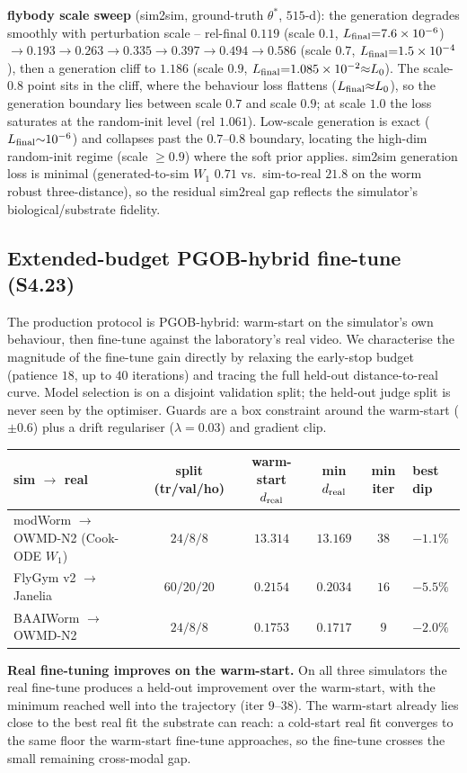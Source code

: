 \documentclass[11pt]{article}
\begin{document}
\textbf{flybody scale sweep} (sim2sim, ground-truth $\theta^{*}$, $515$-d): the generation degrades smoothly with perturbation scale -- rel-final $0.119$ (scale $0.1$, $L_{\rm final}{=}7.6\times10^{-6}$) $\to0.193\to0.263\to0.335\to0.397\to0.494\to0.586$ (scale $0.7$, $L_{\rm final}{=}1.5\times10^{-4}$), then a generation cliff to $1.186$ (scale $0.9$, $L_{\rm final}{=}1.085\times10^{-2}{\approx}L_0$). The scale-$0.8$ point sits in the cliff, where the behaviour loss flattens ($L_{\rm final}{\approx}L_0$), so the generation boundary lies between scale $0.7$ and scale $0.9$; at scale $1.0$ the loss saturates at the random-init level (rel $1.061$). Low-scale generation is exact ($L_{\rm final}{\sim}10^{-6}$) and collapses past the $0.7$--$0.8$ boundary, locating the high-dim random-init regime (scale $\ge0.9$) where the soft prior applies. sim2sim generation loss is minimal (generated-to-sim $W_1$ $0.71$ vs.\ sim-to-real $21.8$ on the worm robust three-distance), so the residual sim2real gap reflects the simulator's biological/substrate fidelity.

\subsection{Extended-budget PGOB-hybrid fine-tune (S4.23)}
\label{si:hybrid_extended}
The production protocol is PGOB-hybrid: warm-start on the simulator's own behaviour, then fine-tune against the laboratory's real video. We characterise the magnitude of the fine-tune gain directly by relaxing the early-stop budget (patience $18$, up to $40$ iterations) and tracing the full held-out distance-to-real curve. Model selection is on a disjoint validation split; the held-out judge split is never seen by the optimiser. Guards are a box constraint around the warm-start ($\pm0.6$) plus a drift regulariser ($\lambda{=}0.03$) and gradient clip.
\begin{center}\small
\begin{tabular}{lccccl}\toprule
sim $\to$ real & split (tr/val/ho) & warm-start $d_{\rm real}$ & min $d_{\rm real}$ & min iter & best dip \\\midrule
modWorm $\to$ OWMD-N2 (Cook-ODE $W_1$) & $24/8/8$ & $13.314$ & $13.169$ & $38$ & $-1.1\%$ \\
FlyGym v2 $\to$ Janelia & $60/20/20$ & $0.2154$ & $0.2034$ & $16$ & $-5.5\%$ \\
BAAIWorm $\to$ OWMD-N2 & $24/8/8$ & $0.1753$ & $0.1717$ & $9$ & $-2.0\%$ \\\bottomrule
\end{tabular}
\end{center}
\textbf{Real fine-tuning improves on the warm-start.} On all three simulators the real fine-tune produces a held-out improvement over the warm-start, with the minimum reached well into the trajectory (iter $9$--$38$). The warm-start already lies close to the best real fit the substrate can reach: a cold-start real fit converges to the same floor the warm-start fine-tune approaches, so the fine-tune crosses the small remaining cross-modal gap.
\end{document}
